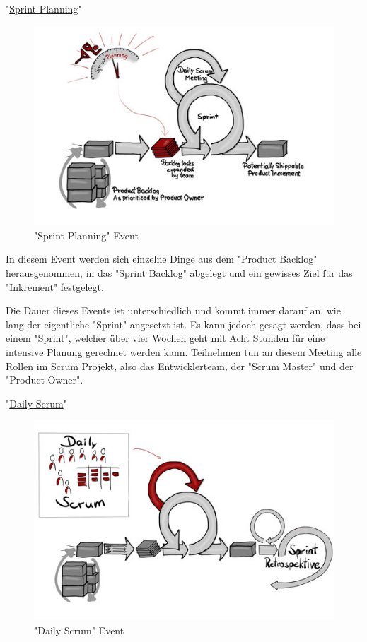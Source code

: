\cite{Scrum}

"\underline{Sprint Planning}"

\begin{figure}[H]
    \centering
    \includegraphics[width=\textwidth]{media/ProjectManagement/SprintPlanning.jpg}
    \caption{"Sprint Planning" Event \cite{PlanningBild}}
\end{figure}

In diesem Event werden sich einzelne Dinge aus dem "Product Backlog" herausgenommen, in das "Sprint Backlog" abgelegt und ein gewisses Ziel für das "Inkrement" festgelegt.

Die Dauer dieses Events ist unterschiedlich und kommt immer darauf an, wie lang der eigentliche "Sprint" angesetzt ist. Es kann jedoch gesagt werden, dass bei einem "Sprint", welcher über vier Wochen geht mit Acht Stunden für eine intensive Planung gerechnet werden kann. Teilnehmen tun an diesem Meeting alle Rollen im Scrum Projekt, also das Entwicklerteam, der "Scrum Master" und der "Product Owner". \cite{Planning}

"\underline{Daily Scrum}"

\begin{figure}[H]
    \centering
    \includegraphics[width=\textwidth]{media/ProjectManagement/DailyScrum.jpg}
    \caption{"Daily Scrum" Event \cite{DailyScrumBild}}
\end{figure}

